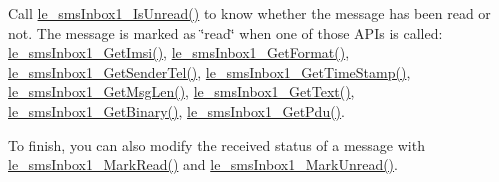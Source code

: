 Call \hyperlink{le__sms_inbox1__interface_8h_a9f7be15b8e499a305efdcbed8a009255}{le\+\_\+sms\+Inbox1\+\_\+\+Is\+Unread()} to know whether the message has been read or not. The message is marked as \char`\"{}read\char`\"{} when one of those A\+P\+Is is called\+: \hyperlink{le__sms_inbox1__interface_8h_a47b7188457df57060544353824a722e5}{le\+\_\+sms\+Inbox1\+\_\+\+Get\+Imsi()}, \hyperlink{le__sms_inbox1__interface_8h_a7daf191029452574c2f73be31745ddd5}{le\+\_\+sms\+Inbox1\+\_\+\+Get\+Format()}, \hyperlink{le__sms_inbox1__interface_8h_a526785c35a6dcaabaff01b3959b25eb4}{le\+\_\+sms\+Inbox1\+\_\+\+Get\+Sender\+Tel()}, \hyperlink{le__sms_inbox1__interface_8h_aea859f08a7d8115d4839a59ce1be987c}{le\+\_\+sms\+Inbox1\+\_\+\+Get\+Time\+Stamp()}, \hyperlink{le__sms_inbox1__interface_8h_a99ac3b4b8d886a2c797c221a00f01bd6}{le\+\_\+sms\+Inbox1\+\_\+\+Get\+Msg\+Len()}, \hyperlink{le__sms_inbox1__interface_8h_aa35b73bd6e76889b4ab93e021e14c7a6}{le\+\_\+sms\+Inbox1\+\_\+\+Get\+Text()}, \hyperlink{le__sms_inbox1__interface_8h_a74a7caad34f457e0c3fb5a741f5089ae}{le\+\_\+sms\+Inbox1\+\_\+\+Get\+Binary()}, \hyperlink{le__sms_inbox1__interface_8h_ac1f8f65a60e406752394499ee3d60883}{le\+\_\+sms\+Inbox1\+\_\+\+Get\+Pdu()}.

To finish, you can also modify the received status of a message with \hyperlink{le__sms_inbox1__interface_8h_a19c1e0e3e27a2d44374a1774b582b1ff}{le\+\_\+sms\+Inbox1\+\_\+\+Mark\+Read()} and \hyperlink{le__sms_inbox1__interface_8h_a82ad6e7eb4ced962f6205acb87a8f62a}{le\+\_\+sms\+Inbox1\+\_\+\+Mark\+Unread()}.

